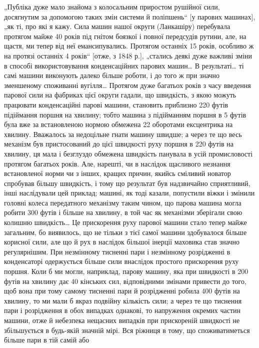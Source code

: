 „Публіка дуже мало знайома з колосальним приростом рушійної сили, досягнутим за допомогою таких змін
системи й поліпшень“ [у парових машинах], „як ті, про які я кажу. Сила машин нашої округи
(Ланкашіру) перебувала протягом майже 40 років
під гнітом боязкої і повної передсудів рутини, але, на щастя,
ми тепер від неї емансипувались. Протягом останніх 15 років,
особливо ж на протязі останніх 4 років“ [отже, з 1848 р.], „стались деякі дуже важливі зміни в
способі використовування конденсаційних парових машин\dots{} В результаті\dots{} ті самі машини виконують
далеко більше роботи, і до того ж при значно зменшеному споживанні вугілля\dots{} Протягом дуже багатьох
років
з часу введення парової сили на фабриках цієї округи гадали,
що швидкість, з якою можуть працювати конденсаційні парові
машини, становить приблизно 220 футів підіймання поршня на
хвилину; тобто машина з підійманням поршня в 5 футів була вже
за встановленою нормою обмежена 22 оборотами ексцентрика на
хвилину. Вважалось за недоцільне гнати машину швидше; а через
те що весь механізм був пристосований до цієї швидкості руху
поршня в 220 футів на хвилину, ця мала і безглуздо обмежена
швидкість панувала в усій промисловості протягом багатьох років.
Але, нарешті, чи в наслідок щасливого незнання встановленої норми
чи з інших, кращих причин, якийсь сміливий новатор спробував
більшу швидкість, і тому що результат був надзвичайно сприятливий, інші наслідували цей приклад;
машині, як тоді казали, попустили віжки і змінили головні колеса передатного механізму таким
чином, що парова машина могла робити 300 футів і більше на
хвилину, в той час як механізми зберігали свою колишню швидкість\dots{} Це прискорення руху парової
машини стало тепер майже
загальним, бо виявилось, що не тільки з тієї самої машини здобувалося більше корисної сили, але що й
рух в наслідок більшої
інерції маховика став значно регулярнішим. При незмінному
тисненні пари і незмінному розрідженні в конденсаторі одержується більше сили внаслідок простого
прискорення руху
поршня. Коли б ми могли, наприклад, парову машину, яка при
швидкості в 200 футів на хвилину дає 40 кінських сил, відповідними змінами привести до того, щоб
вона при тому самому тисненні
пари й розрідженні робила 400 футів на хвилину, то ми мали б
якраз подвійну кількість сили; а через те що тиснення пари
і розрідження в обох випадках однакові, то напруження окремих
частин машини, отже й небезпека нещасних випадків при прискореній швидкості не збільшується в
будь-якій значній мірі. Вся ріжниця в тому, що споживатиметься більше пари в тій самій або
